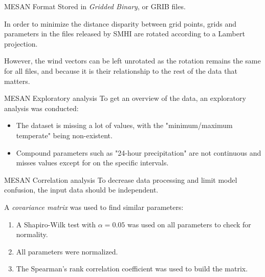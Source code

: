 \documentclass[10pt]{beamer}
\begin{document}
\begin{frame}{MESAN Format}
Stored in \textit{Gridded Binary}, or GRIB files.
\par
In order to minimize the distance disparity between grid points, grids and parameters in the files released by SMHI are rotated according to a Lambert projection.
\par
However, the wind vectors can be left unrotated as the rotation remains the same for all files, and because it is their relationship to the rest of the data that matters.
\end{frame}




\begin{frame}{MESAN Exploratory analysis}
To get an overview of the data, an exploratory analysis was conducted:
\begin{itemize}
\item The dataset is missing a lot of values, with the "minimum/maximum temperate" being non-existent.
\item Compound parameters such as "24-hour precipitation" are not continuous and misses values except for on the specific intervals.
\end{itemize}
\end{frame}


\begin{frame}{MESAN Correlation analysis}
To decrease data processing and limit model confusion, the input data should be independent.
\par
A \textit{covariance matrix} was used to find similar parameters:
\begin{enumerate}
	\item A Shapiro-Wilk test with $\alpha=0.05$ was used on all parameters to check for normality.
	\item All parameters were normalized.
	\item The Spearman's rank correlation coefficient was used to build the matrix.
\end{enumerate}
\end{frame}
\end{document}
